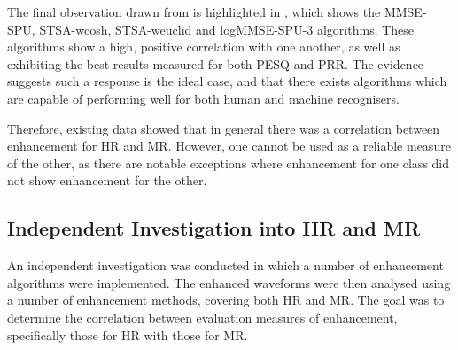 The final observation drawn from  is highlighted
in , which shows the \ac{MMSE-SPU}, \ac{STSA-wcosh},
\ac{STSA-weuclid} and \ac{logMMSE-SPU-3} algorithms. These algorithms
show a high, positive correlation with one another, as well as exhibiting
the best results measured for both \ac{PESQ} and \ac{PRR}. The evidence
suggests such a response is the ideal case, and that there exists
algorithms which are capable of performing well for both human and
machine recognisers.

Therefore, existing data showed that in general there was a correlation
between enhancement for \ac{HR} and \ac{MR}. However, one cannot
be used as a reliable measure of the other, as there are notable exceptions
where enhancement for one class did not show enhancement for the other.

\clearpage{}


\subsection{Independent Investigation into \acl{HR} and \acl{MR}\label{sub:Independent-Investigation-Res}}

An independent investigation was conducted in which a number of enhancement
algorithms were implemented. The enhanced waveforms were then analysed
using a number of enhancement methods, covering both \ac{HR} and
\ac{MR}. The goal was to determine the correlation between evaluation
measures of enhancement, specifically those for \ac{HR} with those
for \ac{MR}.

